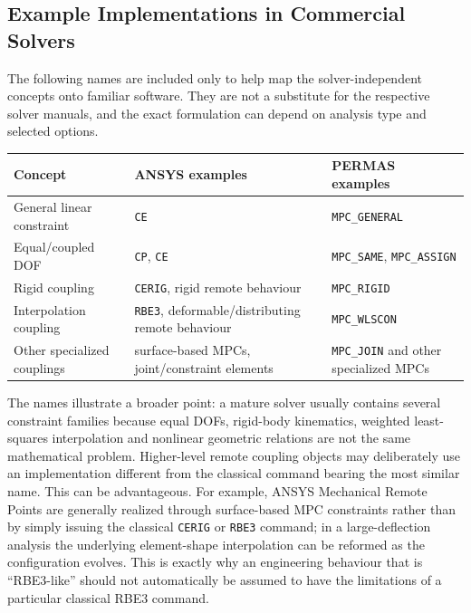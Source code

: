 \subsection{Example Implementations in Commercial Solvers}

The following names are included only to help map the solver-independent concepts
onto familiar software. They are not a substitute for the respective solver
manuals, and the exact formulation can depend on analysis type and selected
options.

\begin{center}
\begin{tabular}{|p{}|p{}|p{}|}
\hline
\textbf{Concept} & \textbf{ANSYS examples} & \textbf{PERMAS examples} \\
\hline
General linear constraint & \texttt{CE} & \texttt{MPC\_GENERAL} \\
\hline
Equal/coupled DOF & \texttt{CP}, \texttt{CE} & \texttt{MPC\_SAME}, \texttt{MPC\_ASSIGN} \\
\hline
Rigid coupling & \texttt{CERIG}, rigid remote behaviour & \texttt{MPC\_RIGID} \\
\hline
Interpolation coupling & \texttt{RBE3}, deformable/distributing remote behaviour & \texttt{MPC\_WLSCON} \\
\hline
Other specialized couplings & surface-based MPCs, joint/constraint elements & \texttt{MPC\_JOIN} and other specialized MPCs \\
\hline
\end{tabular}
\end{center}

The names illustrate a broader point: a mature solver usually contains several
constraint families because equal DOFs, rigid-body kinematics, weighted
least-squares interpolation and nonlinear geometric relations are not the same
mathematical problem. Higher-level remote coupling objects may deliberately use
an implementation different from the classical command bearing the most similar
name. This can be advantageous. For example, ANSYS Mechanical Remote Points are
generally realized through surface-based MPC constraints rather than by simply
issuing the classical \texttt{CERIG} or \texttt{RBE3} command; in a
large-deflection analysis the underlying element-shape interpolation can be
reformed as the configuration evolves. This is exactly why an engineering
behaviour that is ``RBE3-like'' should not automatically be assumed to have the
limitations of a particular classical RBE3 command.

